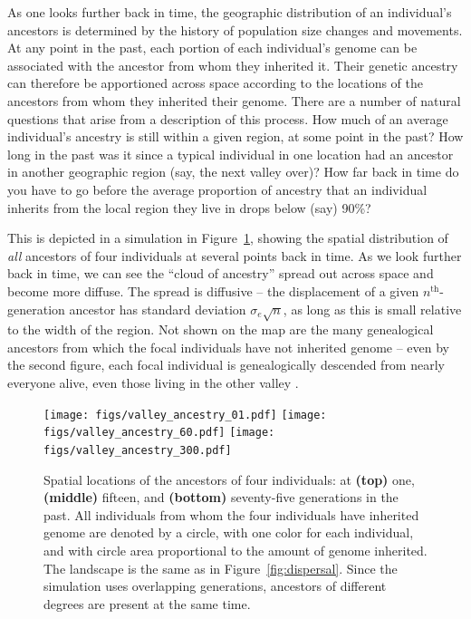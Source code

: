 \documentclass{ar-1col}
\begin{document}
As one looks further back in time,
the geographic distribution of an individual's ancestors
is determined by the history of population size changes and movements.
At any point in the past,
each portion of each individual's genome can be associated 
with the ancestor from whom they inherited it.
Their genetic ancestry can therefore be apportioned across space according
to the locations of the ancestors from whom they inherited their genome.
There are a number of natural questions that arise from a description of this process.
How much of an average individual's ancestry is still within a given region, 
at some point in the past?
How long in the past was it since a typical individual in one location had an ancestor
in another geographic region (say, the next valley over)?
How far back in time do you have to go before 
the average proportion of ancestry that an individual inherits
from the local region they live in drops below (say) 90\%?

This is depicted in a simulation in Figure~\ref{ancestry_spread},
showing the spatial distribution of \textit{all} ancestors of four individuals
at several points back in time.
As we look further back in time,
we can see the ``cloud of ancestry'' spread out across space
and become more diffuse.
The spread is diffusive --
the displacement of a given $n^\text{th}$-generation ancestor 
has standard deviation $\sigma_e \sqrt{n}$,
as long as this is small relative to the width of the region.
Not shown on the map are the many genealogical ancestors
from which the focal individuals have not inherited genome --
even by the second figure,
each focal individual is genealogically descended from nearly everyone alive,
even those living in the other valley \citep{chang1999}.

\begin{figure}[H]
        \texttt{[image: figs/valley\_ancestry\_01.pdf]}
        \texttt{[image: figs/valley\_ancestry\_60.pdf]}
        \texttt{[image: figs/valley\_ancestry\_300.pdf]}
        \caption{
            Spatial locations of the ancestors of four individuals:
            at 
            \textbf{(top)} one, 
            \textbf{(middle)} fifteen, and
            \textbf{(bottom)} seventy-five generations in the past.
            All individuals from whom the four individuals have inherited genome are denoted by a circle,
            with one color for each individual,
            and with circle area proportional to the amount of genome inherited.
            The landscape is the same as in Figure~\ref{fig:dispersal}.
            Since the simulation uses overlapping generations,
            ancestors of different degrees are present at the same time.
        }
        \label{ancestry_spread}
\end{figure}
\end{document}
